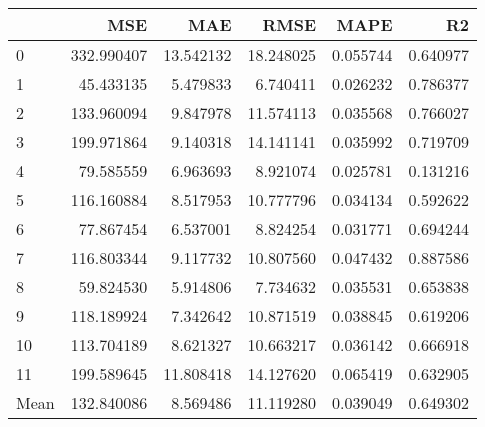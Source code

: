 \begin{tabular}{lrrrrr}
\toprule
 & MSE & MAE & RMSE & MAPE & R2 \\
\midrule
0 & 332.990407 & 13.542132 & 18.248025 & 0.055744 & 0.640977 \\
1 & 45.433135 & 5.479833 & 6.740411 & 0.026232 & 0.786377 \\
2 & 133.960094 & 9.847978 & 11.574113 & 0.035568 & 0.766027 \\
3 & 199.971864 & 9.140318 & 14.141141 & 0.035992 & 0.719709 \\
4 & 79.585559 & 6.963693 & 8.921074 & 0.025781 & 0.131216 \\
5 & 116.160884 & 8.517953 & 10.777796 & 0.034134 & 0.592622 \\
6 & 77.867454 & 6.537001 & 8.824254 & 0.031771 & 0.694244 \\
7 & 116.803344 & 9.117732 & 10.807560 & 0.047432 & 0.887586 \\
8 & 59.824530 & 5.914806 & 7.734632 & 0.035531 & 0.653838 \\
9 & 118.189924 & 7.342642 & 10.871519 & 0.038845 & 0.619206 \\
10 & 113.704189 & 8.621327 & 10.663217 & 0.036142 & 0.666918 \\
11 & 199.589645 & 11.808418 & 14.127620 & 0.065419 & 0.632905 \\
Mean & 132.840086 & 8.569486 & 11.119280 & 0.039049 & 0.649302 \\
\bottomrule
\end{tabular}
